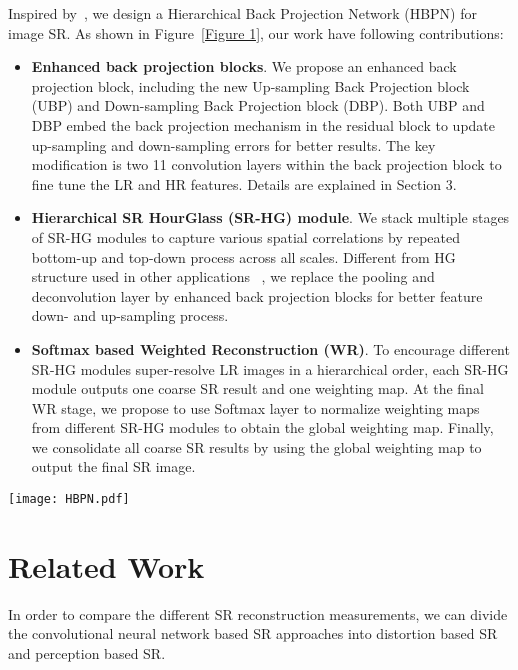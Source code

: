 \documentclass[10pt,twocolumn,letterpaper]{article}
\begin{document}
Inspired by~\cite{DBPN}, we design a Hierarchical Back Projection Network (HBPN) for image SR. As shown in Figure~\ref{Figure 1}, our work have following contributions:
\begin{itemize}
\item \textbf{Enhanced back projection blocks}. We propose an enhanced back projection block, including the new Up-sampling Back Projection block (UBP) and Down-sampling Back Projection block (DBP). Both UBP and DBP embed the back projection mechanism in the residual block to update up-sampling and down-sampling errors for better results. The key modification is two 11 convolution layers within the back projection block to fine tune the LR and HR features. Details are explained in Section 3.
\item \textbf{Hierarchical SR HourGlass (SR-HG) module}. We stack multiple stages of SR-HG modules to capture various spatial correlations by repeated bottom-up and top-down process across all scales. Different from HG structure used in other applications ~\cite{HG1,HG2}, we replace the pooling and deconvolution layer by enhanced back projection blocks for better feature down- and up-sampling process.
\item \textbf{Softmax based Weighted Reconstruction (WR)}. To encourage different SR-HG modules super-resolve LR images in a hierarchical order, each SR-HG module outputs one coarse SR result and one weighting map. At the final WR stage, we propose to use Softmax layer to normalize weighting maps from different SR-HG modules to obtain the global weighting map. Finally, we consolidate all coarse SR results by using the global weighting map to output the final SR image.
\end{itemize}

\begin{figure*}[h]
\vskip 0.01in
\begin{center}
\centerline{\texttt{[image: HBPN.pdf]}}
\caption{Proposed HBPN structure. In a bottom-up and top-down manner, it can explore various scales to extract hierarchical features for image SR.}
\label{Figure 1}
\end{center}
\vskip -0.3in
\end{figure*}


\section{Related Work}

In order to compare the different SR reconstruction measurements, we can divide the convolutional neural network based SR approaches into distortion based SR and perception based SR.
\end{document}
